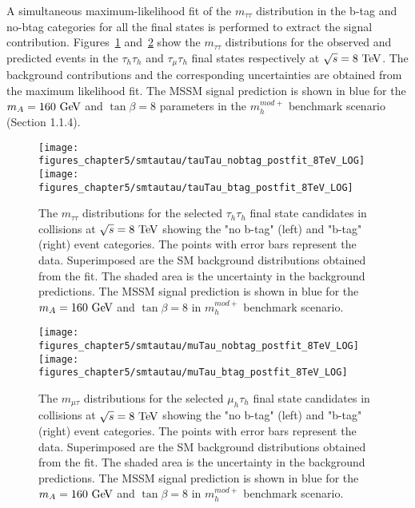 A simultaneous maximum-likelihood fit of the $m_{\tau\tau}$ distribution in the b-tag and no-btag categories for all the final states is performed to extract the signal contribution. Figures~\ref{fig:mssmtauhtauh} and~\ref{fig:mssmmutauh} show the $m_{\tau\tau}$ distributions for the observed and predicted events in the $\tau_h\tau_h$ and $\tau_{\mu}\tau_h$ final states respectively at $\sqrt{s}=8~\mathrm{Te\kern -0.1em V}$.  The background contributions and the corresponding uncertainties are obtained from the maximum likelihood fit. The MSSM signal prediction is shown in blue for the $m_{A}=160~\mathrm{Ge\kern -0.1em V}$ and $\tan\beta = 8$ parameters in the $m_{h}^{mod+}$ benchmark scenario (Section 1.1.4). 
\begin{figure}[htbp]
\centering
\texttt{[image: figures\_chapter5/smtautau/tauTau\_nobtag\_postfit\_8TeV\_LOG]}
\texttt{[image: figures\_chapter5/smtautau/tauTau\_btag\_postfit\_8TeV\_LOG]}
\caption{The $m_{\tau\tau}$ distributions for the selected $\tau_{h}\tau_{h}$ final state candidates in collisions at $\sqrt{s}=8~\mathrm{Te\kern -0.1em V}$ showing the "no b-tag" (left) and "b-tag" (right) event categories. The points with error bars represent the data. Superimposed are the SM background distributions obtained from the fit. The shaded area is the uncertainty in the background predictions. The MSSM signal prediction is shown in blue for the $m_{A}=160~\mathrm{Ge\kern -0.1em V}$ and $\tan \beta=8$ in $m_{h}^{mod+}$ benchmark scenario.}
\label{fig:mssmtauhtauh}
\end{figure}
\begin{figure}[htbp]
\centering
\texttt{[image: figures\_chapter5/smtautau/muTau\_nobtag\_postfit\_8TeV\_LOG]}
\texttt{[image: figures\_chapter5/smtautau/muTau\_btag\_postfit\_8TeV\_LOG]}
\caption{The $m_{\mu\tau}$ distributions for the selected $\mu_{h}\tau_{h}$ final state candidates in collisions at $\sqrt{s}=8~\mathrm{Te\kern -0.1em V}$ showing the "no b-tag" (left) and "b-tag" (right) event categories. The points with error bars represent the data. Superimposed are the SM background distributions obtained from the fit. The shaded area is the uncertainty in the background predictions. The MSSM signal prediction is shown in blue for the $m_{A}=160~\mathrm{Ge\kern -0.1em V}$ and $\tan \beta=8$ in $m_{h}^{mod+}$ benchmark scenario.}
\label{fig:mssmmutauh}
\end{figure}

